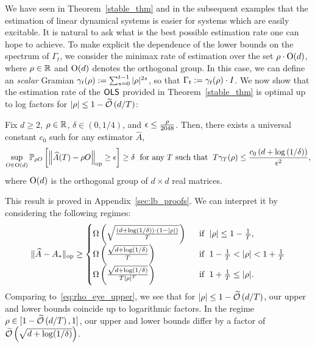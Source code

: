     We have seen in Theorem~\ref{stable_thm} and in the subsequent examples that the estimation of linear dynamical systems is easier for systems
    which are easily excitable. It is natural to ask what is the best possible estimation rate one can hope to achieve. To make explicit the dependence of the lower bounds on the spectrum of $\Gamma_t$, we consider the minimax rate of estimation over the set $\rho \cdot \mathrm{O}(d)$, where $\rho \in \mathbb{R}$ and $\mathrm{O}(d)$ denotes the orthogonal group. In this case, we can define an \emph{scalar} Gramian $\gamma_t(\rho) := \sum_{s=0}^{t-1} |\rho|^{2s}$, so that $\Gamma_t := \gamma_t(\rho) \cdot I$. We now show that the estimation rate of the $\mathsf{OLS }$ provided in Theorem~\ref{stable_thm} is optimal up to log factors for $|\rho| \le 1 - \operatorname{\widetilde{\mathcal{O}}}\left({d/T}\right)$:
    \begin{thm}
    \label{thm:info_lb_d} Fix  $d \ge 2$, $\rho \in \mathbb{R}$, $\delta \in (0,1/4)$, and $\epsilon \le \frac{\rho}{2048}$. Then, there exists a universal constant $c_0$ such for any estimator $\widehat{A}$,
    \begin{eqnarray*}
    \sup_{O \in \mathrm{O}(d)}\mathbb{P}_{\rho O}\left[\left\|\widehat{A}(T) - \rho O\right\|_{\mathrm{op}} \ge \epsilon\right] \ge \delta\; \text{ for any } T \text{ such that }\; T \gamma_{T}(\rho) \leq  \frac{c_0 \left( d + \log\left(1/\delta\right)\right)}{\epsilon^2},
    \end{eqnarray*}
    where $\mathrm{O}(d)$ is the orthogonal group of $d \times d$ real matrices.
    \end{thm}
    This result is proved in Appendix~\ref{sec:lb_proofs}. We can interpret it
    by considering the following regimes:
\begin{align*}
    \lVert \widehat{A} - A_{*} \rVert_{\mathrm{op}} \ge \begin{cases}
        \Omega\left(\sqrt{\frac{(d+\log(1/\delta))\cdot(1 - |\rho|)}{T}}\right)\; &\text{ if }\; |\rho| \leq 1 - \frac{1}{T},\\
        \Omega\left(\frac{\sqrt{d+\log(1/\delta) }}{T}\right)\; &\text{ if }\; 1 - \frac{1}{T} < |\rho| < 1 + \frac{1}{T}\\
        \Omega\left(\frac{\sqrt{d+\log(1/\delta)}}{T|\rho|^T}\right) \; &\text{ if }\; 1 + \frac{1}{T} \le |\rho|.
    \end{cases}
\end{align*}
Comparing to~\eqref{eq:rho_eye_upper}, we see that for $|\rho| \le 1 - \operatorname{\widetilde{\mathcal{O}}}\left({d/T}\right)$, our upper and lower bounds coincide up to logarithmic factors. In the regime $\rho \in [1 - \operatorname{\widetilde{\mathcal{O}}}\left({d/T}\right),1]$, our upper and lower bounds differ by a factor of $\operatorname{\widetilde{\mathcal{O}}}\left({\sqrt{d + \log(1/\delta)}}\right)$. 


